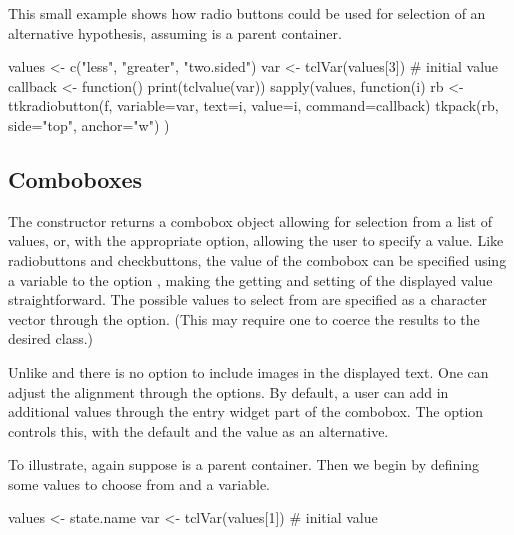 This small example shows how radio buttons could be used for selection
of an alternative hypothesis, assuming  is a parent container.

\begin{Schunk}
\begin{Sinput}
 values <- c("less", "greater", "two.sided")
 var <- tclVar(values[3])                # initial value
 callback <- function() print(tclvalue(var))
 sapply(values, function(i) {
   rb <- ttkradiobutton(f, variable=var, 
                        text=i, value=i, 
                        command=callback)
   tkpack(rb, side="top", anchor="w")
 })
\end{Sinput}
\end{Schunk}


\subsection{Comboboxes}
\label{sec:tcltk:comboboxes}

The  constructor returns a combobox object
allowing for
selection from a list of values, or, with the appropriate option, allowing
the user to specify a value. Like radiobuttons and checkbuttons, the
value of the combobox can be specified using a \TCL\/ variable to the
option , making the getting and
setting of the displayed value straightforward. The possible values to
select from are specified as a character vector through the
 option. (This may require one to coerce
the results to the desired class.)

Unlike \GTK{} and \Qt{} there is no option to include images in the
displayed text. One can adjust the alignment through the
 options.  By default, a user can add in
additional values through the entry widget part of the combobox. The
 option controls this, with the default
 and the value  as an alternative.

To illustrate, again suppose  is a parent container. Then we
begin by defining some values to choose from and a \TCL\/ variable.


\begin{Schunk}
\begin{Sinput}
 values <- state.name
 var <- tclVar(values[1])                # initial value
\end{Sinput}
\end{Schunk}


